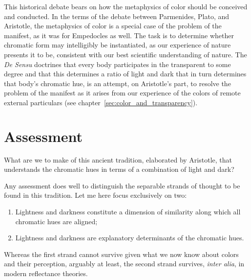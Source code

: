 This historical debate bears on how the metaphysics of color should be conceived and conducted. In the terms of the debate between Parmenides, Plato, and Aristotle, the metaphysics of color is a special case of the problem of the manifest, as it was for Empedocles as well. The task is to determine whether chromatic form may intelligibly be instantiated, as our experience of nature presents it to be, consistent with our best scientific understanding of nature. The \emph{De Sensu} doctrines that every body participates in the transparent to some degree and that this determines a ratio of light and dark that in turn determines that body's chromatic hue, is an attempt, on Aristotle's part, to resolve the problem of the manifest as it arises from our experience of the colors of remote external particulars (see chapter~\ref{sec:color_and_transparency}).



\section{Assessment} %
\label{sec:assessment}

What are we to make of this ancient tradition, elaborated by Aristotle, that understands the chromatic hues in terms of a combination of light and dark?

Any assessment does well to distinguish the separable strands of thought to be found in this tradition. Let me here focus exclusively on two:
\begin{enumerate}[(1)]
	\item Lightness and darkness constitute a dimension of similarity along which all chromatic hues are aligned;
	\item Lightness and darkness are explanatory determinants of the chromatic hues.
\end{enumerate}
Whereas the first strand cannot survive given what we now know about colors and their perception, arguably at least, the second strand survives, \emph{inter alia}, in modern reflectance theories.

